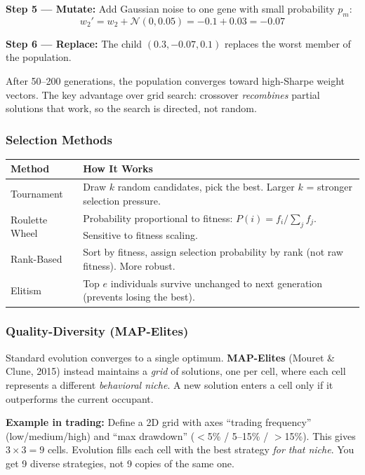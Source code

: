 \documentclass[11pt,a4paper]{article}
\begin{document}
\textbf{Step 5 --- Mutate:} Add Gaussian noise to one gene with small probability $p_m$:
\begin{equation}
w_2' = w_2 + \mathcal{N}(0, 0.05) = -0.1 + 0.03 = -0.07
\end{equation}

\textbf{Step 6 --- Replace:} The child $(0.3, -0.07, 0.1)$ replaces the worst member of the population.

After 50--200 generations, the population converges toward high-Sharpe weight vectors. The key advantage over grid search: crossover \textit{recombines} partial solutions that work, so the search is directed, not random.

\subsubsection{Selection Methods}

\begin{center}
\begin{tabular}{l p{7cm}}
\hline
\textbf{Method} & \textbf{How It Works} \\
\hline
Tournament & Draw $k$ random candidates, pick the best. Larger $k$ = stronger selection pressure. \\
Roulette Wheel & Probability proportional to fitness: $P(i) = f_i / \sum_j f_j$. Sensitive to fitness scaling. \\
Rank-Based & Sort by fitness, assign selection probability by rank (not raw fitness). More robust. \\
Elitism & Top $e$ individuals survive unchanged to next generation (prevents losing the best). \\
\hline
\end{tabular}
\end{center}

\subsubsection{Quality-Diversity (MAP-Elites)}

Standard evolution converges to a single optimum. \textbf{MAP-Elites} (Mouret \& Clune, 2015) instead maintains a \textit{grid} of solutions, one per cell, where each cell represents a different \textit{behavioral niche}. A new solution enters a cell only if it outperforms the current occupant.

\textbf{Example in trading:} Define a 2D grid with axes ``trading frequency'' (low/medium/high) and ``max drawdown'' ($<$5\% / 5--15\% / $>$15\%). This gives $3 \times 3 = 9$ cells. Evolution fills each cell with the best strategy \textit{for that niche}. You get 9 diverse strategies, not 9 copies of the same one.
\end{document}
